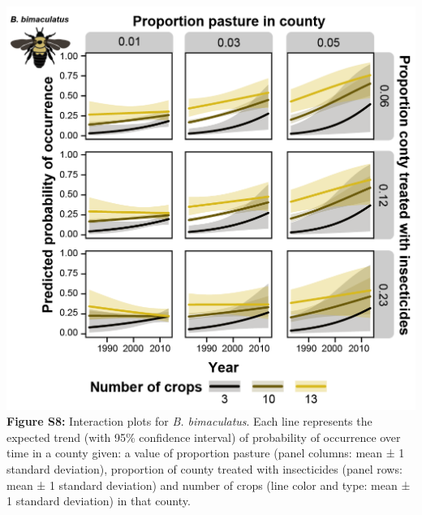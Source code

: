 \documentclass[11pt,]{article}
\begin{document}
\includegraphics[width=1\textwidth,height=\textheight]{../ms_figs/fig_s8.png}
\textbf{Figure S8:} Interaction plots for \emph{B. bimaculatus}. Each
line represents the expected trend (with 95\% confidence interval) of
probability of occurrence over time in a county given: a value of
proportion pasture (panel columns: mean ± 1 standard deviation),
proportion of county treated with insecticides (panel rows: mean ± 1
standard deviation) and number of crops (line color and type: mean ± 1
standard deviation) in that county. \clearpage

\newpage
\end{document}
